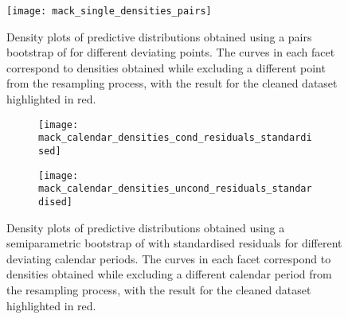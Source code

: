 \documentclass[a4paper]{book}
\begin{document}
\begin{landscape}
  \setlength\tabcolsep{4pt}
  \renewcommand{\arraystretch}{1.2}
  
\end{landscape}

\begin{landscape}
  \begin{figure}
    \centering
    \texttt{[image: mack\_single\_densities\_pairs]}
    \caption[Single outlier density plots for Mack's model, pairs bootstrap]{Density plots of predictive distributions obtained using a pairs bootstrap of  for different deviating points. The curves in each facet correspond to densities obtained while excluding a different point from the resampling process, with the result for the cleaned dataset highlighted in red. }
    \label{fig:mack-single-pairs}
  \end{figure}
\end{landscape}

\begin{landscape}
  \setlength\tabcolsep{2pt}
  \renewcommand{\arraystretch}{1.2}
  
\end{landscape}

\begin{landscape}
  \begin{figure}
    \begin{subfigure}{0.5\linewidth}
      \centering
      \texttt{[image: mack\_calendar\_densities\_cond\_residuals\_standardised]}
      \label{fig:mack-calendar-cond-semiparam-standard}
    \end{subfigure}
    \begin{subfigure}{0.5\linewidth}
      \centering
      \texttt{[image: mack\_calendar\_densities\_uncond\_residuals\_standardised]}
      \label{fig:mack-calendar-uncond-semiparam-standard}
    \end{subfigure}
    \caption[Calendar outlier density plots for Mack's model, semiparametric bootstrap with standardised residuals]{Density plots of predictive distributions obtained using a semiparametric bootstrap of  with standardised residuals for different deviating calendar periods. The curves in each facet correspond to densities obtained while excluding a different calendar period from the resampling process, with the result for the cleaned dataset highlighted in red.}
  \end{figure}
\end{landscape}
\end{document}
